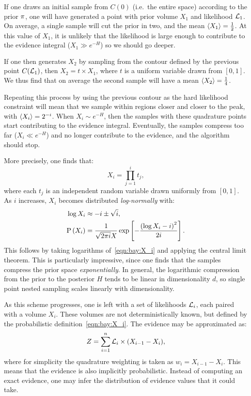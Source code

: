If one draws an initial sample from \(C(0)\) (i.e.\ the entire space) according to the prior \(\pi\), one will have generated a point with prior volume \(X_1\) and likelihood \(\mathcal{L}_1\). On average, a single sample will cut the prior in two, and the mean \({\left\langle{X_1}\right\rangle}=\frac{1}{2}\). At this value of \(X_1\), it is unlikely that the likelihood is large enough to contribute to the evidence integral (\(X_1\gg e^{-H}\)) so we should go deeper.

If one then generates \(X_2\) by sampling from the contour defined by the previous point \(C(\mathcal{L}_1)\), then \(X_2=t\times X_1\), where \(t\) is a uniform variable drawn from \([0,1]\). We thus find that on average the second sample will have a mean \({\left\langle{X_2}\right\rangle} = \frac{1}{4}\). 

Repeating this process by using the previous contour as the hard likelihood constraint will mean that we sample within regions closer and closer to the peak, with \({\left\langle{X_i}\right\rangle} = 2^{-i}\). When \(X_i\sim e^{-H}\), then the samples with these quadrature points start contributing to the evidence integral. Eventually, the samples compress too far (\(X_i\ll e^{-H}\)) and no longer contribute to the evidence, and the algorithm should stop.

More precisely, one finds that:
\begin{equation}
  X_i = \prod_{j=1}^i t_j,
  \label{eqn:bay:X_i}
\end{equation}
where each \(t_j\) is an independent random variable drawn uniformly from \([0,1]\). As \(i\) increases, \(X_i\) becomes distributed {\em log-normally\/} with:
\begin{align}
  \log X_i  &\approx -i \pm \sqrt{i},
  \label{eqn:bay:log_normal_1_1}
  \\
  \mathrm{P}\left(X_i\right) &= \frac{1}{\sqrt{2\pi i} X}\exp\left[ -\frac{{\left( \log X_i - i \right)}^2}{2 i}  \right].
  \label{eqn:bay:log_normal_1_2}
\end{align}
This follows by taking logarithms of~\eqref{eqn:bay:X_i} and applying the central limit theorem. This is particularly impressive, since one finds that the samples compress the prior space {\em exponentially}. In general, the logarithmic compression from the prior to the posterior \(H\) tends to be linear in dimensionality \(d\), so single point nested sampling scales linearly with dimensionality.

As this scheme progresses, one is left with a set of likelihoods \(\mathcal{L}_i\), each paired with a volume \(X_i\). These volumes are not deterministically known, but defined by the probabilistic definition~\eqref{eqn:bay:X_i}. The evidence may be approximated as:
\begin{equation}
  Z = \sum_{i=1}^n \mathcal{L}_i \times (X_{i-1}-X_{i}),
  \label{eqn:bay:ev_sum}
\end{equation}
where for simplicity the quadrature weighting is taken as \(w_i = X_{i-1}-X_i\). This means that the evidence is also implicitly probabilistic. Instead of computing an exact evidence, one may infer the distribution of evidence values that it could take.

